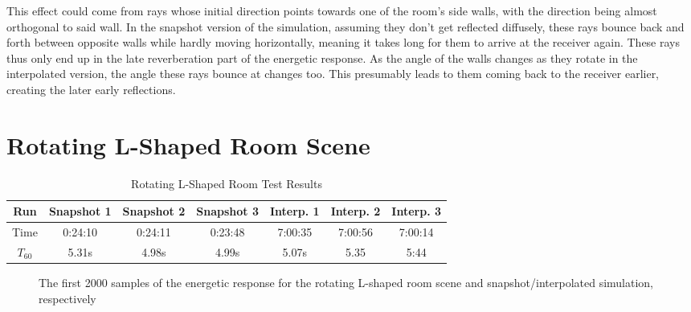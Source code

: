 \newline
This effect could come from rays whose initial direction points towards one of the room's side walls,
with the direction being almost orthogonal to said wall.
In the snapshot version of the simulation, assuming they don't get reflected diffusely,
these rays bounce back and forth between opposite walls while hardly moving horizontally,
meaning it takes long for them to arrive at the receiver again.
These rays thus only end up in the late reverberation part of the energetic response.
\newline
As the angle of the walls changes as they rotate in the interpolated version,
the angle these rays bounce at changes too.
This presumably leads to them coming back to the receiver earlier, creating the later early reflections.

\section{Rotating L-Shaped Room Scene}\label{sec:LRoom}

\begin{table}[t!]
    \centering
    \begin{tabular}{| c | c | c | c | c | c | c |}
        \hline
        Run        & Snapshot 1 & Snapshot 2 & Snapshot 3 & Interp. 1 & Interp. 2 & Interp. 3 \\
        \hline
        Time       & 0:24:10    & 0:24:11    & 0:23:48    & 7:00:35   & 7:00:56   & 7:00:14   \\
        \hline
        \(T_{60}\) & 5.31s      & 4.98s      & 4.99s      & 5.07s     & 5.35      & 5:44      \\
        \hline
    \end{tabular}
    \caption{Rotating L-Shaped Room Test Results}\label{tbl:LSceneTable}
\end{table}

\begin{figure}[t!]
    \begin{center}
        
    \end{center}
    \caption{The first 2000 samples of the energetic response for the rotating L-shaped room scene and snapshot/interpolated simulation, respectively}\label{fig:LSceneIR}
\end{figure}

